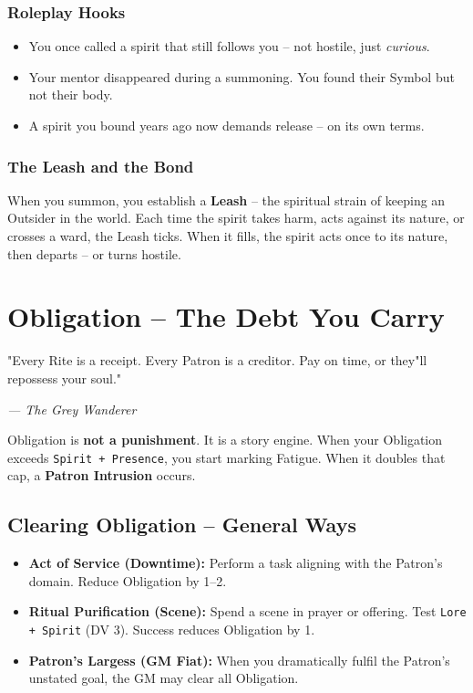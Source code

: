 \documentclass[10pt,a5paper]{book}
\begin{document}
\subsection{Roleplay Hooks}
\begin{itemize}
    \item You once called a spirit that still follows you -- not hostile, just \textit{curious}.
    \item Your mentor disappeared during a summoning. You found their Symbol but not their body.
    \item A spirit you bound years ago now demands release -- on its own terms.
\end{itemize}

\subsection{The Leash and the Bond}
When you summon, you establish a \textbf{Leash} -- the spiritual strain of keeping an Outsider in the world. Each time the spirit takes harm, acts against its nature, or crosses a ward, the Leash ticks. When it fills, the spirit acts once to its nature, then departs -- or turns hostile.

\clearpage

\chapter{Obligation -- The Debt You Carry}
\epigraph{"Every Rite is a receipt. Every Patron is a creditor. Pay on time, or they"ll repossess your soul."}{\textit{--- The Grey Wanderer}}

Obligation is \textbf{not a punishment}. It is a story engine. When your Obligation exceeds \texttt{Spirit + Presence}, you start marking Fatigue. When it doubles that cap, a \textbf{Patron Intrusion} occurs.

\section{Clearing Obligation -- General Ways}
\begin{itemize}
    \item \textbf{Act of Service (Downtime):} Perform a task aligning with the Patron's domain. Reduce Obligation by 1--2.
    \item \textbf{Ritual Purification (Scene):} Spend a scene in prayer or offering. Test \texttt{Lore + Spirit} (DV 3). Success reduces Obligation by 1.
    \item \textbf{Patron's Largess (GM Fiat):} When you dramatically fulfil the Patron's unstated goal, the GM may clear all Obligation.
\end{itemize}
\end{document}
